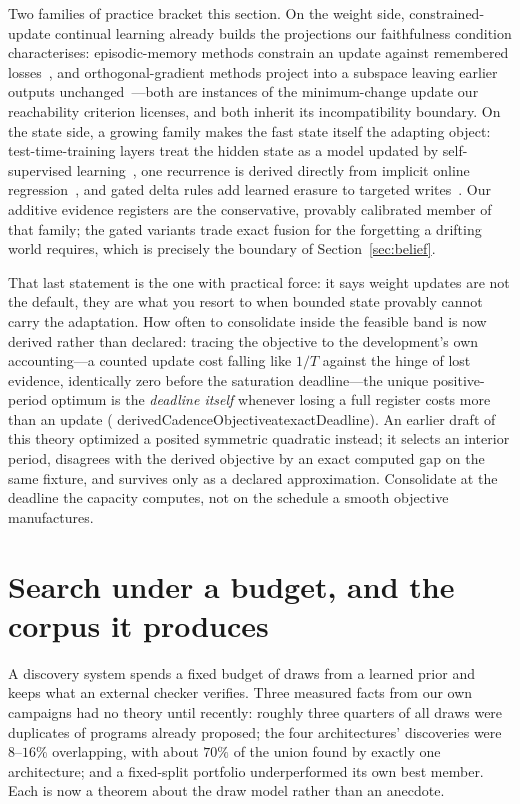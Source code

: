 \documentclass[11pt]{article}
\newcommand{\leanname}[1]{{\scriptsize\ttfamily
  \def\_{\textunderscore\allowbreak}#1}}
\begin{document}
Two families of practice bracket this section. On the weight side, constrained-update
continual learning already builds the projections our faithfulness condition characterises:
episodic-memory methods constrain an update against remembered losses~\cite{lopezpaz2017},
and orthogonal-gradient methods project into a subspace leaving earlier outputs
unchanged~\cite{farajtabar2020}---both are instances of the minimum-change update our
reachability criterion licenses, and both inherit its incompatibility boundary. On the state
side, a growing family makes the fast state itself the adapting object: test-time-training
layers treat the hidden state as a model updated by self-supervised
learning~\cite{sun2024}, one recurrence is derived directly from implicit online
regression~\cite{liu2024}, and gated delta rules add learned erasure to targeted
writes~\cite{yang2024}. Our additive evidence registers are the conservative, provably
calibrated member of that family; the gated variants trade exact fusion for the forgetting a
drifting world requires, which is precisely the boundary of Section~\ref{sec:belief}.

That last statement is the one with practical force: it says weight updates are not the
default, they are what you resort to when bounded state provably cannot carry the
adaptation. How often to consolidate inside the feasible band is now derived rather than
declared: tracing the objective to the development's own accounting---a counted update
cost falling like $1/T$ against the hinge of lost evidence, identically zero before the
saturation deadline---the unique positive-period optimum is the \emph{deadline itself}
whenever losing a full register costs more than an update
(\leanname{derivedCadenceObjective\_at\_exactDeadline}). An earlier draft of this theory
optimized a posited symmetric quadratic instead; it selects an interior period, disagrees
with the derived objective by an exact computed gap on the same fixture, and survives only
as a declared approximation. Consolidate at the deadline the capacity computes, not on the
schedule a smooth objective manufactures.

\section{Search under a budget, and the corpus it produces}
\label{sec:search}

A discovery system spends a fixed budget of draws from a learned prior and keeps what an
external checker verifies. Three measured facts from our own campaigns had no theory
until recently: roughly three quarters of all draws were duplicates of programs already
proposed; the four architectures' discoveries were $8$--$16\%$ overlapping, with about
$70\%$ of the union found by exactly one architecture; and a fixed-split portfolio
underperformed its own best member. Each is now a theorem about the draw model rather
than an anecdote.
\end{document}
